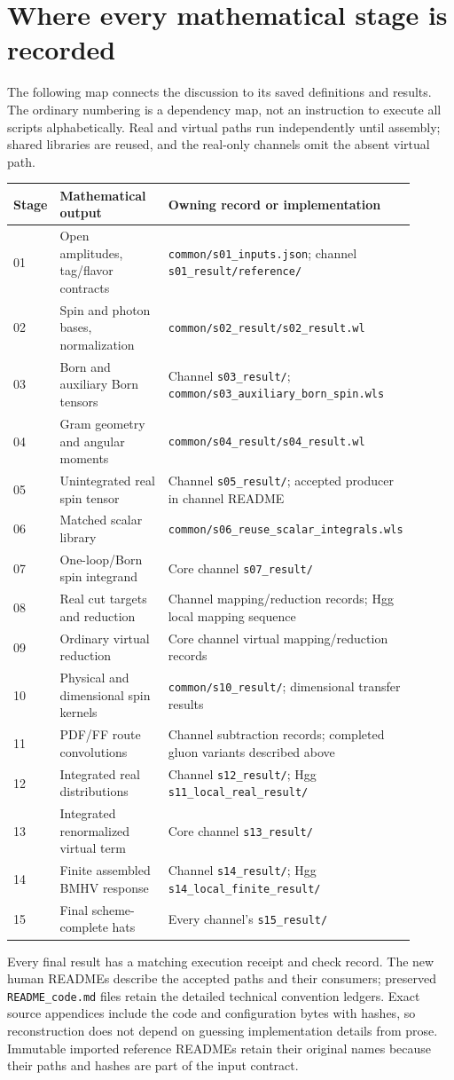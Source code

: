 \documentclass[11pt,a4paper]{article}
\newcommand{\code}[1]{{\small\nolinkurl{#1}}}
\begin{document}
\section{Where every mathematical stage is recorded}
The following map connects the discussion to its saved definitions and results. The ordinary numbering is a dependency map, not an instruction to execute all scripts alphabetically. Real and virtual paths run independently until assembly; shared libraries are reused, and the real-only channels omit the absent virtual path.
\begin{longtable}{p{0.07\linewidth}p{0.36\linewidth}p{0.47\linewidth}}
\toprule Stage & Mathematical output & Owning record or implementation\\\midrule\endhead
01 & Open amplitudes, tag/flavor contracts & \code{common/s01_inputs.json}; channel \code{s01_result/reference/}\\
02 & Spin and photon bases, normalization & \code{common/s02_result/s02_result.wl}\\
03 & Born and auxiliary Born tensors & Channel \code{s03_result/}; \code{common/s03_auxiliary_born_spin.wls}\\
04 & Gram geometry and angular moments & \code{common/s04_result/s04_result.wl}\\
05 & Unintegrated real spin tensor & Channel \code{s05_result/}; accepted producer in channel README\\
06 & Matched scalar library & \code{common/s06_reuse_scalar_integrals.wls}\\
07 & One-loop/Born spin integrand & Core channel \code{s07_result/}\\
08 & Real cut targets and reduction & Channel mapping/reduction records; Hgg local mapping sequence\\
09 & Ordinary virtual reduction & Core channel virtual mapping/reduction records\\
10 & Physical and dimensional spin kernels & \code{common/s10_result/}; dimensional transfer results\\
11 & PDF/FF route convolutions & Channel subtraction records; completed gluon variants described above\\
12 & Integrated real distributions & Channel \code{s12_result/}; Hgg \code{s11_local_real_result/}\\
13 & Integrated renormalized virtual term & Core channel \code{s13_result/}\\
14 & Finite assembled BMHV response & Channel \code{s14_result/}; Hgg \code{s14_local_finite_result/}\\
15 & Final scheme-complete hats & Every channel's \code{s15_result/}\\\bottomrule
\end{longtable}
Every final result has a matching execution receipt and check record. The new human READMEs describe the accepted paths and their consumers; preserved \code{README_code.md} files retain the detailed technical convention ledgers. Exact source appendices include the code and configuration bytes with hashes, so reconstruction does not depend on guessing implementation details from prose. Immutable imported reference READMEs retain their original names because their paths and hashes are part of the input contract.
\end{document}
